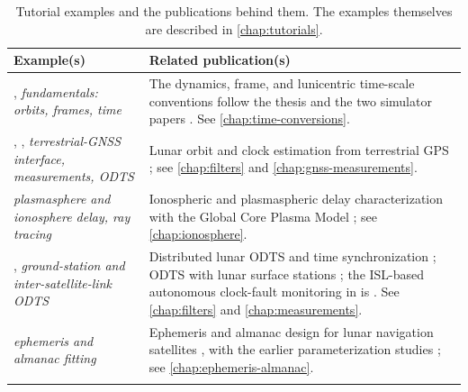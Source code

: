 \begin{table}[H]
  \centering
  \caption{Tutorial examples and the publications behind them. The examples
           themselves are described in \cref{chap:tutorials}.}
  \label{tab:pub-examples}
  \begin{tabularx}{\textwidth}{@{}>{\raggedright\arraybackslash}p{}L@{}}
    \toprule
    Example(s) & Related publication(s) \\
    \midrule
    ,  \newline
      \emph{fundamentals: orbits, frames, time} &
      The dynamics, frame, and lunicentric time-scale conventions follow the
      thesis \citep[Ch.~2]{iiyama2026thesis} and the two simulator papers
      \citep{iiyama2023lupnt, casadesus2025lupnt}. See
      \cref{chap:time-conversions}. \\
    \addlinespace
    , ,  \newline
      \emph{terrestrial-GNSS interface, measurements, ODTS} &
      Lunar orbit and clock estimation from terrestrial GPS
      \citep{iiyama2024navi, iiyama2026scud}; see \cref{chap:filters} and
      \cref{chap:gnss-measurements}. \\
    \addlinespace
     \newline
      \emph{plasmasphere and ionosphere delay, ray tracing} &
      Ionospheric and plasmaspheric delay characterization with the Global Core
      Plasma Model \citep{iiyama2026gcpm, iiyama2025iono}; see
      \cref{chap:ionosphere}. \\
    \addlinespace
    ,  \newline
      \emph{ground-station and inter-satellite-link ODTS} &
      Distributed lunar ODTS and time synchronization
      \citep{iiyama2023dcp, iiyama2024contact}; ODTS with lunar surface
      stations \citep{casadesus2025surface}; the ISL-based autonomous
      clock-fault monitoring in  is \citep{iiyama2026edm}. See
      \cref{chap:filters} and \cref{chap:measurements}. \\
    \addlinespace
     \newline
      \emph{ephemeris and almanac fitting} &
      Ephemeris and almanac design for lunar navigation satellites
      \citep{iiyama2025ephemeris}, with the earlier parameterization studies
      \citep{cortinovis2024navi, cortinovis2023ephemeris}; see
      \cref{chap:ephemeris-almanac}. \\
    \addlinespace
     \newline

\end{tabularx}
\end{table}
